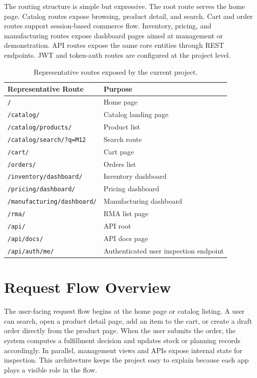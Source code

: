 \documentclass[12pt,letterpaper,oneside,openany]{book}
\begin{document}
\begin{justifying}
The routing structure is simple but expressive. The root route serves the home
page. Catalog routes expose browsing, product detail, and search. Cart and
order routes support session-based commerce flow. Inventory, pricing, and
manufacturing routes expose dashboard pages aimed at management or
demonstration. API routes expose the same core entities through REST endpoints.
JWT and token-auth routes are configured at the project level.
\end{justifying}

\begin{table}[H]
\centering
\begin{tabular}{|p{2.6in}|p{2.7in}|}
\hline
\textbf{Representative Route} & \textbf{Purpose} \\ \hline
\texttt{/} & Home page \\ \hline
\texttt{/catalog/} & Catalog landing page \\ \hline
\texttt{/catalog/products/} & Product list \\ \hline
\texttt{/catalog/search/?q=M12} & Search route \\ \hline
\texttt{/cart/} & Cart page \\ \hline
\texttt{/orders/} & Orders list \\ \hline
\texttt{/inventory/dashboard/} & Inventory dashboard \\ \hline
\texttt{/pricing/dashboard/} & Pricing dashboard \\ \hline
\texttt{/manufacturing/dashboard/} & Manufacturing dashboard \\ \hline
\texttt{/rma/} & RMA list page \\ \hline
\texttt{/api/} & API root \\ \hline
\texttt{/api/docs/} & API docs page \\ \hline
\texttt{/api/auth/me/} & Authenticated user inspection endpoint \\ \hline
\end{tabular}
\caption{Representative routes exposed by the current project.}
\label{tab:routes}
\end{table}

\section{Request Flow Overview}

\begin{justifying}
The user-facing request flow begins at the home page or catalog listing. A
user can search, open a product detail page, add an item to the cart, or create
a draft order directly from the product page. When the user submits the order,
the system computes a fulfillment decision and updates stock or planning records
accordingly. In parallel, management views and APIs expose internal state for
inspection. This architecture keeps the project easy to explain because each app
plays a visible role in the flow.
\end{justifying}
\end{document}
